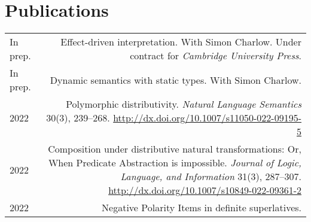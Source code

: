 \documentclass[12pt]{article}
\renewcommand{\arraystretch}{1.25} %
\newcommand{\doi}[1]{\url{http://dx.doi.org/#1}}
\newcommand{\refmark}{\textcolor{gray}{}}
\begin{document}
\medskip

\section*{Publications%
}

\begingroup
\renewcommand{\arraystretch}{1.5} %
\begin{longtable}{LR}
  In prep.
        & Effect-driven interpretation.\newline
          With Simon Charlow.\newline
          Under contract for \textit{Cambridge University Press}.\\
  In prep.
        & Dynamic semantics with static types.\newline
          With Simon Charlow.\\
  2022  & Polymorphic distributivity.\newline
          \textit{Natural Language Semantics} 30(3), 239--268.\newline
          \doi{10.1007/s11050-022-09195-5}\\
  2022  & Composition under distributive natural transformations: Or, When
          Predicate Abstraction is impossible.\newline
          \textit{Journal of Logic, Language, and Information} 31(3), 287--307.\newline
          \doi{10.1007/s10849-022-09361-2}\\
  2022  & Negative Polarity Items in definite superlatives.\newline

\end{longtable}
\end{document}
